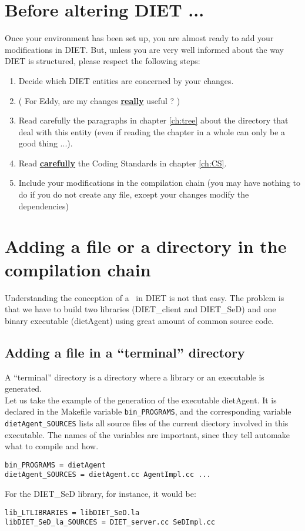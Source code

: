 \section{Before altering DIET ...}

Once your environment has been set up, you are almost ready to add your
modifications in DIET. But, unless you are very well informed about the way DIET
is structured, please respect the following steps:
\begin{enumerate}
\item Decide which DIET entities are concerned by your changes.
\item ( For Eddy, are my changes \underline{\textbf{really}} useful ? )
\item Read carefully the paragraphs in chapter \ref{ch:tree} about the
  directory that deal with this entity (even if reading the chapter in a whole
  can only be a good thing ...).
\item Read \underline{\textbf{carefully}} the Coding Standards in chapter
  \ref{ch:CS}.
\item Include your modifications in the compilation chain (you may have nothing
  to do if you do not create any file, except your changes modify the
  dependencies)
\end{enumerate}


\section{Adding a file or a directory in the compilation chain}


Understanding the conception of a \makeam\ in DIET is not that easy. The problem
is that we have to build two libraries (\textsf{DIET\_client} and
\textsf{DIET\_SeD}) and one binary executable (\textsf{dietAgent}) using great
amount of common source code.

\subsection{Adding a file in a ``terminal'' directory}

A ``terminal'' directory is a directory where a library or an executable is
generated.\\

Let us take the example of the generation of the executable \textsf{dietAgent}.
It is declared in the Makefile variable \texttt{bin\_PROGRAMS}, and the
corresponding variable \texttt{dietAgent\_SOURCES} lists all source files of the
current diectory involved in this executable. The names of the variables are
important, since they tell \textsf{automake} what to compile and how.
\begin{verbatim}
bin_PROGRAMS = dietAgent
dietAgent_SOURCES = dietAgent.cc AgentImpl.cc ...
\end{verbatim}
For the \textsf{DIET\_SeD} library, for instance, it would be:
\begin{verbatim}
lib_LTLIBRARIES = libDIET_SeD.la
libDIET_SeD_la_SOURCES = DIET_server.cc SeDImpl.cc
\end{verbatim}

